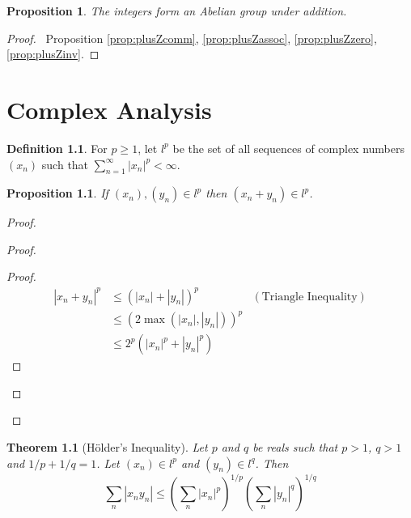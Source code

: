\documentclass{book}
\let\qed\relax
\newtheorem{prop}[ax]{Proposition}
\newtheorem{thm}[ax]{Theorem}
\theoremstyle{definition}
\newtheorem{df}[ax]{Definition}
\begin{document}
\begin{prop}
The integers form an Abelian group under addition.
\end{prop}

\begin{proof}
\pf\ Proposition \ref{prop:plusZcomm}, \ref{prop:plusZassoc}, \ref{prop:plusZzero}, \ref{prop:plusZinv}. \qed
\end{proof}

\chapter{Complex Analysis}

\begin{df}
For $p \geq 1$, let $l^p$ be the set of all sequences of complex numbers $(x_n)$ such that $\sum_{n=1}^\infty |x_n|^p < \infty$.
\end{df}

\begin{prop}
\label{prop:lp_closed_under_addition}
If $(x_n), (y_n) \in l^p$ then $(x_n + y_n) \in l^p$.
\end{prop}

\begin{proof}
\pf
{}
\begin{proof}
	\pf
	\begin{proof}
		\pf
		\begin{align*}
			|x_n + y_n|^p & \leq (|x_n| + |y_n|)^p & (\text{Triangle Inequality}) \\
			& \leq (2 \max(|x_n|,|y_n|))^p \\
			& \leq 2^p (|x_n|^p + |y_n|^p)
		\end{align*}
	\end{proof}
\end{proof}
\qed
\end{proof}

\begin{thm}[H\"{o}lder's Inequality]
Let $p$ and $q$ be reals such that $p > 1$, $q > 1$ and $1/p + 1/q = 1$. Let $(x_n) \in l^p$ and $(y_n) \in l^q$. Then
\[ \sum_n |x_n y_n| \leq \left( \sum_n |x_n|^p \right)^{1/p} \left( \sum_n |y_n|^q \right)^{1/q} \]
\end{thm}
\end{document}
